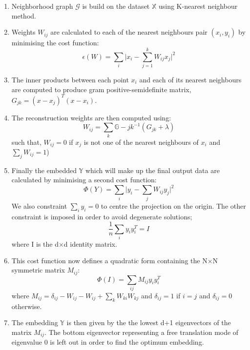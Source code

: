 \begin{enumerate}
\item  Neighborhood graph $\mathcal{G}$ is build on the dataset $\mathbb{X}$ using K-nearest neighbour method. 
\item Weights $W_{ij}$ are calculated to each of the nearest neighbours pair $(x_i, y_i)$ by minimising the cost function:
      \begin{equation}
     \epsilon(W) = \sum_{i}\vert x_{i} - \sum_{j=1}^k W_{ij} x_{j}\vert^{2}
    \end{equation}
   
\item The inner products between each point $x_i$ and each of its nearest neighbours are computed to produce gram positive-semidefinite matrix, $G_{jk} = (x -x_j)^T(x-x_i)$.
\item  The reconstruction weights are then computed using:
    \begin{equation}
     W_{ij} = \sum_{k}\mathbb{G}-{jk}^{-1}(G_{jk}+\lambda)
    \end{equation}
    such that, $W_{ij} =0 $ if $x_{j}$ is not one of the nearest neighbours of $x_{i}$ and $\sum_{j} W_{ij} = 1$)
    
\item Finally the embedded $\mathbb{Y}$ which will make up the final output data are calculated by minimising a second cost function:
    \begin{equation}
     \Phi(Y) = \sum_{i}\vert y_{i}-\sum_{j}W_{ij}y_{j}\vert^{2}
    \end{equation}
We also constraint $\sum_{i}y_{i} = 0$ to centre the projection on the origin. The other constraint is imposed in order to avoid degenerate solutions;
    \begin{equation}
     \frac{1}{n}\sum_{i}y_{i}y_{i}^{T} = I
    \end{equation}
    where I is the d$\times$d identity matrix.
    
\item     This cost function now defines a quadratic form containing the N$\times$N symmetric matrix $M_{ij}$:
    \begin{equation}
     \Phi(I) =\sum_{ij}M_{ij}y_{i}y_{i}^{T}
    \end{equation}
    where $M_{ij} = \delta_{ij}-W_{ij}-W_{ij}+\sum_{k}W_{ki}W_{kj}$ and $\delta_{ij} = 1$ if $i = j$ and $\delta_{ij} = 0$ otherwise.
\item The embedding $\mathbb{Y}$ is then given by the the lowest d+1 eigenvectors of the matrix $M_{ij}$. The bottom eigenvector representing a 
free translation mode of eigenvalue 0 is left out in order to find the optimum embedding.

\end{enumerate}

